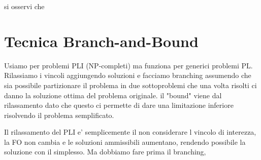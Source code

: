 si osservi che 

\section{Tecnica Branch-and-Bound}
Usiamo per problemi PLI (NP-completi) ma funziona per generici problemi PL. Rilassiamo i vincoli aggiungendo soluzioni e facciamo branching assumendo che sia possibile partizionare il problema in due sottoproblemi che una volta risolti ci danno la soluzione ottima del problema originale. il "bound" viene dal rilassamento dato che questo ci permette di dare una limitazione inferiore risolvendo il problema semplificato.

Il rilassamento del PLI e' semplicemente il non considerare l vincolo di interezza, la FO non cambia e le soluzioni ammissibili aumentano, rendendo possibile la soluzione con il simplesso. Ma dobbiamo fare prima il branching, 
% 
